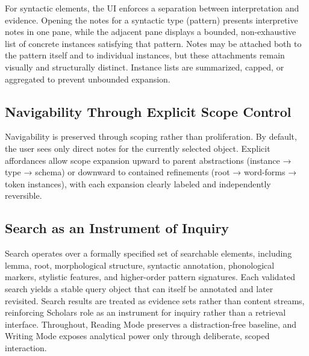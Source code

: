 \documentclass[12pt,a4paper]{article}
\begin{document}
For syntactic elements, the UI enforces a separation between
interpretation and evidence. Opening the notes for a syntactic type
(pattern) presents interpretive notes in one pane, while the adjacent
pane displays a bounded, non-exhaustive list of concrete instances
satisfying that pattern. Notes may be attached both to the pattern
itself and to individual instances, but these attachments remain
visually and structurally distinct. Instance lists are summarized,
capped, or aggregated to prevent unbounded expansion.

\subsection{Navigability Through Explicit Scope
Control}\label{navigability-through-explicit-scope-control}

Navigability is preserved through scoping rather than proliferation. By
default, the user sees only direct notes for the currently selected
object. Explicit affordances allow scope expansion upward to parent
abstractions (instance → type → schema) or downward to contained
refinements (root → word-forms → token instances), with each expansion
clearly labeled and independently reversible.

\subsection{Search as an Instrument of
Inquiry}\label{search-as-an-instrument-of-inquiry}

Search operates over a formally specified set of searchable elements,
including lemma, root, morphological structure, syntactic annotation,
phonological markers, stylistic features, and higher-order pattern
signatures. Each validated search yields a stable query object that can
itself be annotated and later revisited. Search results are treated as
evidence sets rather than content streams, reinforcing
Scholar\textquotesingle s role as an instrument for inquiry rather than
a retrieval interface. Throughout, Reading Mode preserves a
distraction-free baseline, and Writing Mode exposes analytical power
only through deliberate, scoped interaction.
\end{document}
